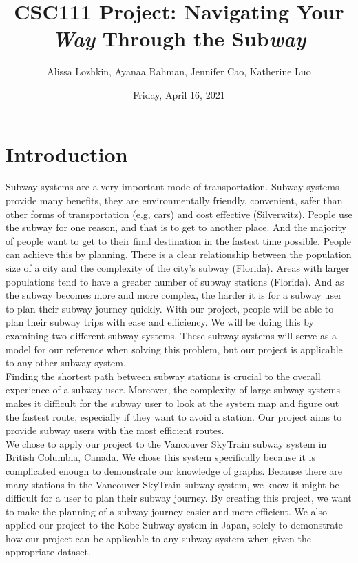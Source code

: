 \documentclass[fontsize=11pt]{article}
\title{CSC111 Project: Navigating Your \textit{Way} Through the Sub\textit{way}}
\author{Alissa Lozhkin, Ayanaa Rahman, Jennifer Cao, Katherine Luo}
\date{Friday, April 16, 2021}
\begin{document}
\maketitle
\section*{Introduction} 

Subway systems are a very important mode of transportation. Subway systems provide many benefits, they are environmentally friendly, convenient, safer than other forms of transportation (e.g, cars) and cost effective (Silverwitz). People use the subway for one reason, and that is to get to another place. And the majority of people want to get to their final destination in the fastest time possible. People can achieve this by planning. There is a clear relationship between the population size of a city and the complexity of the city’s subway (Florida). Areas with larger populations tend to have a greater number of subway stations (Florida). And as the subway becomes more and more complex, the harder it is for a subway user to plan their subway journey quickly. With our project, people will be able to plan their subway trips with ease and efficiency. We will be doing this by examining two different subway systems. These subway systems will serve as a model for our reference when solving this problem, but our project is applicable to any other subway system. \\

Finding the shortest path between subway stations is crucial to the overall experience of a subway user. Moreover, the complexity of large subway systems makes it difficult for the subway user to look at the system map and figure out the fastest route, especially if they want to avoid a station.  Our project aims to provide subway users with the most efficient routes. \\

We chose to apply our project to the Vancouver SkyTrain subway system in British Columbia, Canada. We chose this system specifically because it is complicated enough to demonstrate our knowledge of graphs. Because there are many stations in the Vancouver SkyTrain subway system, we know it might be difficult for a user to plan their subway journey. By creating this project, we want to make the planning of a subway journey easier and more efficient. We also applied our project to the Kobe Subway system in Japan, solely to demonstrate how our project can be applicable to any subway system when given the appropriate dataset. \\
\end{document}
